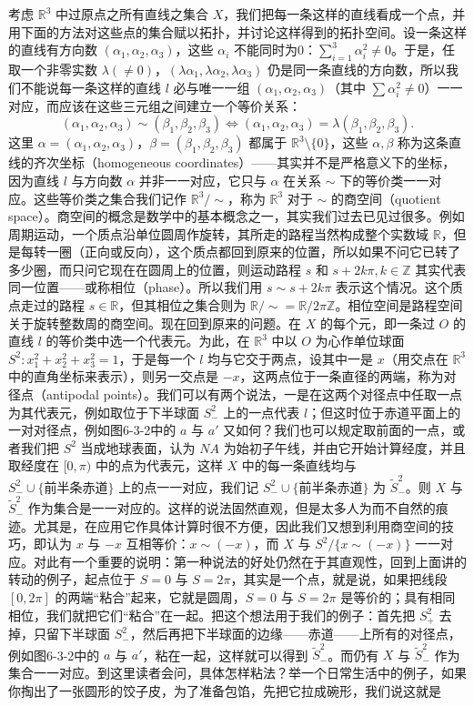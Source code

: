 考虑 $\mathbb R^3$ 中过原点之所有直线之集合 $X$，我们把每一条这样的直线看成一个点，并用下面的方法对这些点的集合赋以拓扑，并讨论这样得到的拓扑空间。设一条这样的直线有方向数 $(\alpha_1,\alpha_2,\alpha_3)$，这些 $\alpha_i$ 不能同时为0：$\sum_{i=1}^3\alpha_i^2\ne0$。于是，任取一个非零实数 $\lambda(\ne0)$，$(\lambda\alpha_1,\lambda\alpha_2,\lambda\alpha_3)$ 仍是同一条直线的方向数，所以我们不能说每一条这样的直线 $l$ 必与唯一一组 $(\alpha_1,\alpha_2,\alpha_3)$（其中 $\sum \alpha_i^2\ne0$）一一对应，而应该在这些三元组之间建立一个等价关系：
\[
 (\alpha_1,\alpha_2,\alpha_3)\sim(\beta_1,\beta_2,\beta_3)
 \iff
 (\alpha_1,\alpha_2,\alpha_3)=\lambda(\beta_1,\beta_2,\beta_3).
\]
这里 $\alpha=(\alpha_1,\alpha_2,\alpha_3)$，$\beta=(\beta_1,\beta_2,\beta_3)$ 都属于 $\mathbb R^3\setminus\{0\}$，这些 $\alpha,\beta$ 称为这条直线的齐次坐标（homogeneous coordinates）——其实并不是严格意义下的坐标，因为直线 $l$ 与方向数 $\alpha$ 并非一一对应，它只与 $\alpha$ 在关系 $\sim$ 下的等价类一一对应。这些等价类之集合我们记作 $\mathbb R^3/\sim$，称为 $\mathbb R^3$ 对于 $\sim$ 的商空间（quotient space）。商空间的概念是数学中的基本概念之一，其实我们过去已见过很多。例如周期运动，一个质点沿单位圆周作旋转，其所走的路程当然构成整个实数域 $\mathbb R$，但是每转一圈（正向或反向），这个质点都回到原来的位置，所以如果不问它已转了多少圈，而只问它现在在圆周上的位置，则运动路程 $s$ 和 $s+2k\pi,k\in\mathbb Z$ 其实代表同一位置——或称相位（phase）。所以我们用 $s\sim s+2k\pi$ 表示这个情况。这个质点走过的路程 $s\in\mathbb R$，但其相位之集合则为 $\mathbb R/\sim=\mathbb R/2\pi\mathbb Z$。相位空间是路程空间关于旋转整数周的商空间。现在回到原来的问题。在 $X$ 的每个元，即一条过 $O$ 的直线 $l$ 的等价类中选一个代表元。为此，在 $\mathbb R^3$ 中以 $O$ 为心作单位球面 $S^2:x_1^2+x_2^2+x_3^2=1$，于是每一个 $l$ 均与它交于两点，设其中一是 $x$（用交点在 $\mathbb R^3$ 中的直角坐标来表示），则另一交点是 $-x$，这两点位于一条直径的两端，称为对径点（antipodal points）。我们可以有两个说法，一是在这两个对径点中任取一点为其代表元，例如取位于下半球面 $S_-^2$ 上的一点代表 $l$；但这时位于赤道平面上的一对对径点，例如图6-3-2中的 $a$ 与 $a'$ 又如何？我们也可以规定取前面的一点，或者我们把 $S^2$ 当成地球表面，认为 $NA$ 为始初子午线，并由它开始计算经度，并且取经度在 $[0,\pi)$ 中的点为代表元，这样 $X$ 中的每一条直线均与 $S_-^2\cup\{\text{前半条赤道}\}$ 上的点一一对应，我们记 $S_-^2\cup\{\text{前半条赤道}\}$ 为 $\widetilde S_-^2$。则 $X$ 与 $\widetilde S_-^2$ 作为集合是一一对应的。这样的说法固然直观，但是太多人为而不自然的痕迹。尤其是，在应用它作具体计算时很不方便，因此我们又想到利用商空间的技巧，即认为 $x$ 与 $-x$ 互相等价：$x\sim(-x)$，而 $X$ 与 $S^2/\{x\sim(-x)\}$ 一一对应。对此有一个重要的说明：第一种说法的好处仍然在于其直观性，回到上面讲的转动的例子，起点位于 $S=0$ 与 $S=2\pi$，其实是一个点，就是说，如果把线段 $[0,2\pi]$ 的两端“粘合”起来，它就是圆周，$S=0$ 与 $S=2\pi$ 是等价的；具有相同相位，我们就把它们“粘合”在一起。把这个想法用于我们的例子：首先把 $S_+^2$ 去掉，只留下半球面 $S_-^2$，然后再把下半球面的边缘——赤道——上所有的对径点，例如图6-3-2中的 $a$ 与 $a'$，粘在一起，这样就可以得到 $\widetilde S_-^2$。而仍有 $X$ 与 $\widetilde S_-^2$ 作为集合一一对应。到这里读者会问，具体怎样粘法？举一个日常生活中的例子，如果你掏出了一张圆形的饺子皮，为了准备包馅，先把它拉成碗形，我们说这就是 